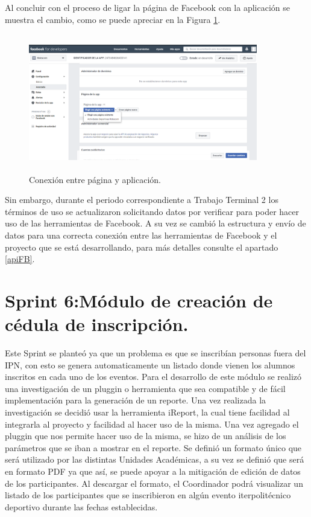 	\noindent Al concluir con el proceso de ligar la página de Facebook con la aplicación se muestra el cambio, como se puede apreciar en la Figura \ref{conexionpaginaapp}.
	
	\begin{figure}[hbt!]
		\centering
		\includegraphics[width=10cm, height=6cm]{Imagenes/CreacionCuentaFB/ConexionPagina}
		\caption{Conexión entre página y aplicación.}
		\label{conexionpaginaapp}
	\end{figure}
	
	
	\noindent Sin embargo, durante el periodo correspondiente a Trabajo Terminal 2 los términos de uso se actualizaron solicitando datos por verificar para poder hacer uso de las herramientas de Facebook. A su vez se cambió la estructura y envío de  datos para una correcta conexión entre las herramientas de Facebook y el proyecto que se está desarrollando, para más detalles consulte el apartado \ref{apiFB}.
	\pagebreak
	
	\section{Sprint 6:Módulo de creación de cédula de inscripción.}
	\noindent Este Sprint se planteó ya que un problema es que se inscribían personas fuera del IPN, con esto se genera automaticamente un listado donde vienen los alumnos inscritos en cada uno de los eventos.
	Para el desarrollo de este módulo se realizó una investigación de un pluggin o herramienta que sea compatible y de fácil implementación para la generación de un reporte. Una vez realizada la investigación se decidió usar la herramienta iReport, la cual tiene facilidad al integrarla al proyecto y facilidad al hacer uso de la misma. Una vez agregado el pluggin que nos permite hacer uso de la misma, se hizo de un análisis de los parámetros que se iban a mostrar en el reporte. Se definió un formato único que será utilizado por las distintas Unidades Académicas, a su vez se definió que será en formato PDF ya que así, se puede apoyar a la mitigación de edición de datos de los participantes. Al descargar el formato, el Coordinador podrá visualizar un listado de los participantes que se inscribieron en algún evento iterpolitécnico deportivo durante las fechas establecidas.
	
